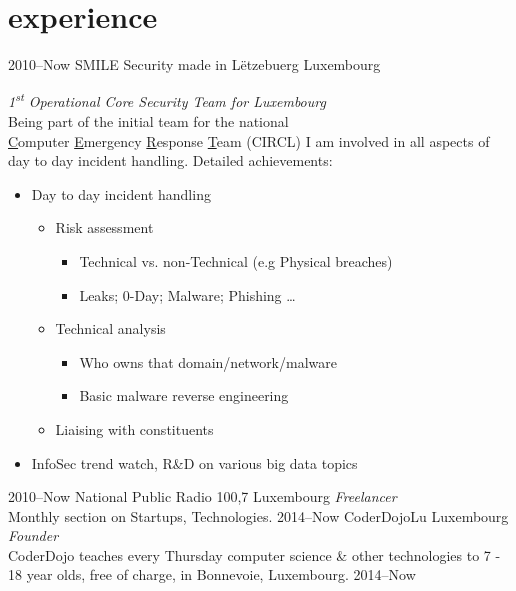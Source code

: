 \documentclass[]{friggeri-cv} %
\begin{document}
\section{experience}
\begin{entrylist}
\entry
{2010--Now}
{SMILE Security made in L\"{e}tzebuerg}
{Luxembourg}
{\emph{1\textsuperscript{st} Operational Core Security Team for Luxembourg} \\
Being part of the initial team for the national \\
\underline{C}omputer \underline{E}mergency \underline{R}esponse \underline{T}eam (CIRCL) I am involved in all aspects of day to day incident handling. Detailed achievements:
\begin{itemize}
    \item Day to day incident handling
    \begin{itemize}
        \item Risk assessment
        \begin{itemize}
        	\item Technical vs. non-Technical (e.g Physical breaches)
            \item Leaks; 0-Day; Malware; Phishing \ldots
        \end{itemize}
        \item Technical analysis
        \begin{itemize}
             \item Who owns that domain/network/malware
             \item Basic malware reverse engineering
        \end{itemize}
        \item Liaising with constituents
    \end{itemize}
    \item InfoSec trend watch, R\&D on various big data topics
\end{itemize}}
\entry
{2010--Now}
{National Public Radio 100,7}
{Luxembourg}
{\emph{Freelancer} \\
Monthly section on Startups, Technologies.}
\entry
{2014--Now}
{CoderDojoLu}
{Luxembourg}
{\emph{Founder} \\
CoderDojo teaches every Thursday computer science \& other technologies to 7 - 18 year olds, free of charge, in Bonnevoie, Luxembourg.}
\entry
{2014--Now}

\end{entrylist}
\end{document}
